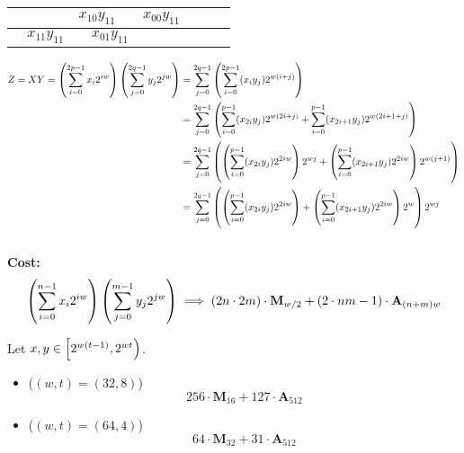 \begin{center}
\begin{tabular}{|c|c|c|c|c|c|c|c|}
\hspace{15pt} & \multicolumn{2}{c|}{$x_{10}y_{11}$} & \multicolumn{2}{c|}{$x_{00}y_{11}$} & \hspace{15pt} & \hspace{15pt} & \hspace{15pt} \\ \hline
\multicolumn{2}{|c|}{$x_{11}y_{11}$} & \multicolumn{2}{c|}{$x_{01}y_{11}$} & \hspace{15pt} & \hspace{15pt} & \hspace{15pt} & \hspace{15pt} \\ \hline
\end{tabular}
\end{center}
\begin{align*}
Z=XY=\left(\sum_{i=0}^{2p-1}x_i2^{iw}\right)\left(\sum_{j=0}^{2q-1}y_j2^{jw}\right)&=\sum_{j=0}^{2q-1}\left(\sum_{i=0}^{2p-1}(x_iy_j)2^{w(i+j)}\right) \\
&=\sum_{j=0}^{2q-1}\left(\sum_{i=0}^{p-1}(x_{2i}y_j)2^{w(2i+j)}+\sum_{i=0}^{p-1}(x_{2i+1}y_j)2^{w(2i+1+j)}\right) \\
&=\sum_{j=0}^{2q-1}\left(\left(\sum_{i=0}^{p-1}(x_{2i}y_j)2^{2iw}\right)2^{wj}+\left(\sum_{i=0}^{p-1}(x_{2i+1}y_j)2^{2iw}\right)2^{w(j+1)}\right) \\
&=\sum_{j=0}^{2q-1}\left(\left(\sum_{i=0}^{p-1}(x_{2i}y_j)2^{2iw}\right)+\left(\sum_{i=0}^{p-1}(x_{2i+1}y_j)2^{2iw}\right)2^{w}\right)2^{wj} \\
\end{align*}
\\
\textbf{Cost:} \[
\left(\sum_{i=0}^{n-1}x_i2^{iw}\right)\left(\sum_{j=0}^{m-1}y_j2^{jw}\right)\implies\left(2n\cdot 2m\right)\cdot\textbf{M}_{w/2} + (2\cdot nm - 1)\cdot\textbf{A}_{(n+m)w}
\]

\begin{example}
Let $x,y\in\intco{2^{w(t-1)},2^{wt}}$.
\begin{itemize}
\item[] ($(w,t)=(32,8)$) \[
256\cdot\textbf{M}_{16} + 127\cdot\textbf{A}_{512}
\]
\item[] ($(w,t)=(64,4)$) \[
64\cdot\textbf{M}_{32} + 31\cdot\textbf{A}_{512}
\]
\end{itemize}
\end{example}








